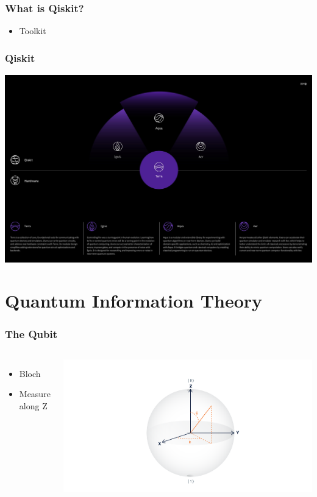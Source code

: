 \documentclass[aspectratio=169,11pt,hyperref={colorlinks=true}]{beamer}
\begin{document}
\begin{frame}
    \frametitle{What is Qiskit?}
    \begin{itemize}
        \item Toolkit
    \end{itemize}
\end{frame}

\begin{frame}
    \frametitle{Qiskit}
    \centering
    \includegraphics[width=.9\textwidth]{qiskit-components.jpeg}
\end{frame}

\section{Quantum Information Theory}
\begin{frame}
    \frametitle{The Qubit}
    \begin{columns}
            \begin{itemize}
                \item Bloch
                \item Measure along Z
            \end{itemize}
            \includegraphics[width=\textwidth]{bloch_angles.png}
    \end{columns}
\end{frame}
\end{document}
